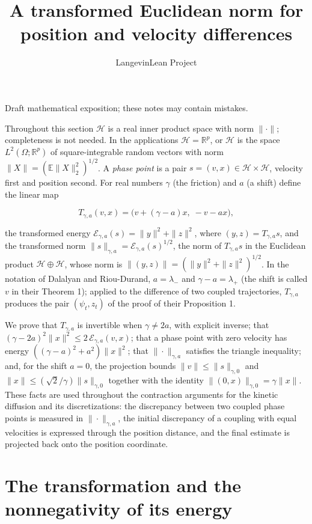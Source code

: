 \documentclass[11pt,a4paper]{article}
\title{\texorpdfstring{A transformed Euclidean norm for position and velocity differences}{A transformed Euclidean norm for position and velocity differences}}
\author{LangevinLean Project}
\date{}
\begin{document}
\maketitle
Draft mathematical exposition; these notes may contain mistakes.


Throughout this section \(\mathcal H\) is a real inner product space with norm \(\|\cdot\|\); completeness is not needed. In the applications \(\mathcal H=\mathbb R^p\), or \(\mathcal H\) is the space \(L^2(\Omega;\mathbb R^p)\) of square-integrable random vectors with norm \(\|X\|=(\mathbb E\|X\|_2^2)^{1/2}\). A \emph{phase point} is a pair \(s=(v,x)\in \mathcal H\times \mathcal H\), velocity first and position second. For real numbers \(\gamma\) (the friction) and \(a\) (a shift) define the linear map


\[T_{\gamma,a}(v,x)=\bigl(v+(\gamma-a)x,\;-v-ax\bigr),\]


the transformed energy \(\mathcal E_{\gamma,a}(s)=\|y\|^2+\|z\|^2\), where \((y,z)=T_{\gamma,a}s\), and the transformed norm \(\|s\|_{\gamma,a}=\mathcal E_{\gamma,a}(s)^{1/2}\), the norm of \(T_{\gamma,a}s\) in the Euclidean product \(\mathcal H\oplus \mathcal H\), whose norm is \(\|(y,z)\|=(\|y\|^2+\|z\|^2)^{1/2}\). In the notation of Dalalyan and Riou-Durand, \(a=\lambda_-\) and \(\gamma-a=\lambda_+\) (the shift is called \(v\) in their Theorem 1); applied to the difference of two coupled trajectories, \(T_{\gamma,a}\) produces the pair \((\psi_t,z_t)\) of the proof of their Proposition 1.




We prove that \(T_{\gamma,a}\) is invertible when \(\gamma\neq2a\), with explicit inverse; that \((\gamma-2a)^2\|x\|^2\le2\,\mathcal E_{\gamma,a}(v,x)\); that a phase point with zero velocity has energy \(((\gamma-a)^2+a^2)\|x\|^2\); that \(\|\cdot\|_{\gamma,a}\) satisfies the triangle inequality; and, for the shift \(a=0\), the projection bounds \(\|v\|\le\|s\|_{\gamma,0}\) and \(\|x\|\le(\sqrt2/\gamma)\|s\|_{\gamma,0}\) together with the identity \(\|(0,x)\|_{\gamma,0}=\gamma\|x\|\). These facts are used throughout the contraction arguments for the kinetic diffusion and its discretizations: the discrepancy between two coupled phase points is measured in \(\|\cdot\|_{\gamma,a}\), the initial discrepancy of a coupling with equal velocities is expressed through the position distance, and the final estimate is projected back onto the position coordinate.


\section{\texorpdfstring{The transformation and the nonnegativity of its energy}{The transformation and the nonnegativity of its energy}}
\end{document}
